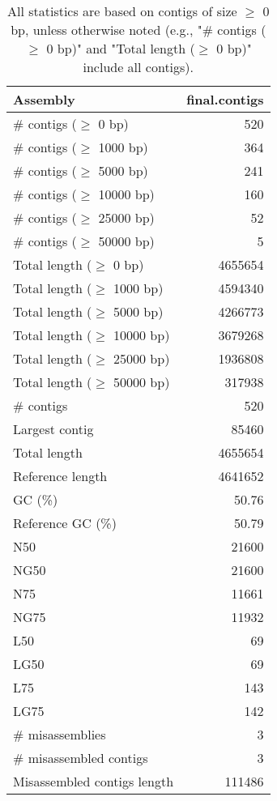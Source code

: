 \documentclass[12pt,a4paper]{article}
\begin{document}
\begin{table}[ht]
\begin{center}
\caption{All statistics are based on contigs of size $\geq$ 0 bp, unless otherwise noted (e.g., "\# contigs ($\geq$ 0 bp)" and "Total length ($\geq$ 0 bp)" include all contigs).}
\begin{tabular}{|l*{1}{|r}|}
\hline
Assembly & final.contigs \\ \hline
\# contigs ($\geq$ 0 bp) & 520 \\ \hline
\# contigs ($\geq$ 1000 bp) & 364 \\ \hline
\# contigs ($\geq$ 5000 bp) & 241 \\ \hline
\# contigs ($\geq$ 10000 bp) & 160 \\ \hline
\# contigs ($\geq$ 25000 bp) & 52 \\ \hline
\# contigs ($\geq$ 50000 bp) & 5 \\ \hline
Total length ($\geq$ 0 bp) & 4655654 \\ \hline
Total length ($\geq$ 1000 bp) & 4594340 \\ \hline
Total length ($\geq$ 5000 bp) & 4266773 \\ \hline
Total length ($\geq$ 10000 bp) & 3679268 \\ \hline
Total length ($\geq$ 25000 bp) & 1936808 \\ \hline
Total length ($\geq$ 50000 bp) & 317938 \\ \hline
\# contigs & 520 \\ \hline
Largest contig & 85460 \\ \hline
Total length & 4655654 \\ \hline
Reference length & 4641652 \\ \hline
GC (\%) & 50.76 \\ \hline
Reference GC (\%) & 50.79 \\ \hline
N50 & 21600 \\ \hline
NG50 & 21600 \\ \hline
N75 & 11661 \\ \hline
NG75 & 11932 \\ \hline
L50 & 69 \\ \hline
LG50 & 69 \\ \hline
L75 & 143 \\ \hline
LG75 & 142 \\ \hline
\# misassemblies & 3 \\ \hline
\# misassembled contigs & 3 \\ \hline
Misassembled contigs length & 111486 \\ \hline

\end{tabular}
\end{center}
\end{table}
\end{document}
